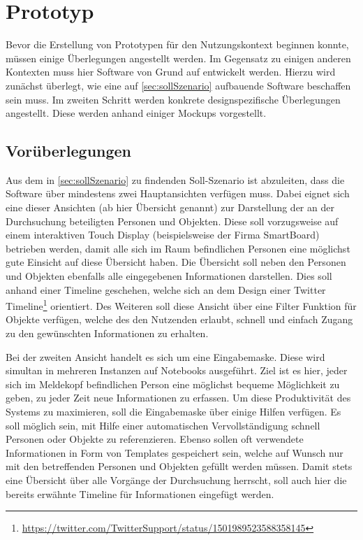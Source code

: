 \section{Prototyp}\label{sec:prototypPraktisch}

Bevor die Erstellung von Prototypen für den Nutzungskontext beginnen konnte, müssen einige Überlegungen angestellt werden.
Im Gegensatz zu einigen anderen Kontexten muss hier Software von Grund auf entwickelt werden.
Hierzu wird zunächst überlegt, wie eine auf \autoref{sec:sollSzenario} aufbauende Software beschaffen sein muss.
Im zweiten Schritt werden konkrete designspezifische Überlegungen angestellt. 
Diese werden anhand einiger Mockups vorgestellt.

\subsection{Vorüberlegungen}

Aus dem in \autoref{sec:sollSzenario} zu findenden Soll-Szenario ist abzuleiten, dass die Software über mindestens zwei Hauptansichten verfügen muss.
Dabei eignet sich eine dieser Ansichten (ab hier Übersicht genannt) zur Darstellung der an der Durchsuchung beteiligten Personen und Objekten.
Diese soll vorzugsweise auf einem interaktiven Touch Display (beispielsweise der Firma SmartBoard) betrieben werden, damit alle sich im Raum befindlichen Personen eine möglichst gute Einsicht auf diese Übersicht haben.
Die Übersicht soll neben den Personen und Objekten ebenfalls alle eingegebenen Informationen darstellen.
Dies soll anhand einer Timeline geschehen, welche sich an dem Design einer Twitter Timeline\footnote{\url{https://twitter.com/TwitterSupport/status/1501989523588358145}} orientiert.
Des Weiteren soll diese Ansicht über eine Filter Funktion für Objekte verfügen, welche des den Nutzenden erlaubt, schnell und einfach Zugang zu den gewünschten Informationen zu erhalten.

Bei der zweiten Ansicht handelt es sich um eine Eingabemaske.
Diese wird simultan in mehreren Instanzen auf Notebooks ausgeführt.
Ziel ist es hier, jeder sich im Meldekopf befindlichen Person eine möglichst bequeme Möglichkeit zu geben, zu jeder Zeit neue Informationen zu erfassen.
Um diese Produktivität des Systems zu maximieren, soll die Eingabemaske über einige Hilfen verfügen.
Es soll möglich sein, mit Hilfe einer automatischen Vervollständigung schnell Personen oder Objekte zu referenzieren.
Ebenso sollen oft verwendete Informationen in Form von Templates gespeichert sein, welche auf Wunsch nur mit den betreffenden Personen und Objekten gefüllt werden müssen.
Damit stets eine Übersicht über alle Vorgänge der Durchsuchung herrscht, soll auch hier die bereits erwähnte Timeline für Informationen eingefügt werden.

